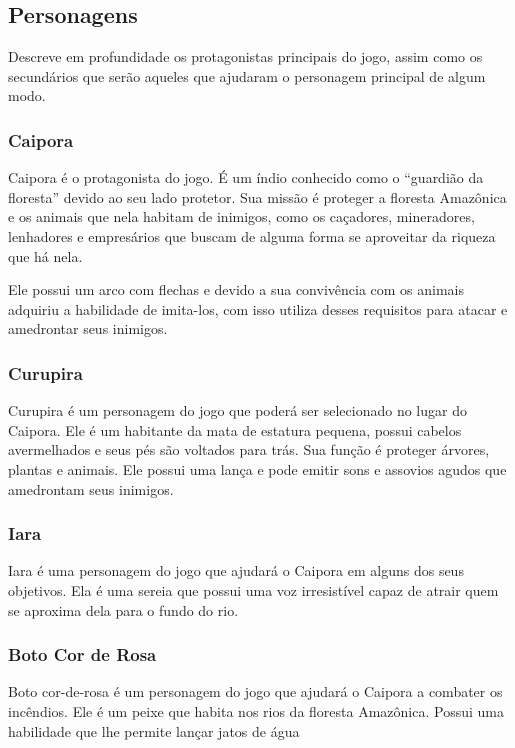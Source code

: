 \subsection {Personagens}
Descreve em profundidade os protagonistas principais do jogo, assim como os secundários que serão aqueles que ajudaram o personagem principal de algum modo.

\subsubsection{Caipora}
Caipora é o protagonista do jogo. É um índio conhecido como o “guardião da floresta” devido ao seu lado protetor. Sua missão é proteger a floresta Amazônica e os animais que nela habitam de inimigos, como os caçadores, mineradores, lenhadores e empresários que buscam de alguma forma se aproveitar da riqueza que há nela. 

Ele possui um arco com flechas e devido a sua convivência com os animais adquiriu a habilidade de imita-los, com isso utiliza desses requisitos para atacar e amedrontar seus inimigos.

\subsubsection{Curupira}
Curupira é um personagem do jogo que poderá ser selecionado no lugar do Caipora. Ele é um habitante da mata de estatura pequena, possui cabelos avermelhados e seus pés são voltados para trás. Sua função é proteger árvores, plantas e animais. Ele possui uma lança e pode emitir sons e assovios agudos que amedrontam seus inimigos.

\subsubsection{Iara}
Iara é uma personagem do jogo que ajudará o Caipora em alguns dos seus objetivos. Ela é uma sereia que possui uma voz irresistível capaz de atrair quem se aproxima dela para o fundo do rio.

\subsubsection{Boto Cor de Rosa}
Boto cor-de-rosa é um personagem do jogo que ajudará o Caipora a combater os incêndios. Ele é um peixe que habita nos rios da floresta Amazônica. Possui uma habilidade que lhe permite lançar jatos de água



